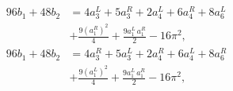 \begin{equation}\begin{split}
96b_1+48b_2&=4a_3^L+5a_3^R+2a_4^L+6a_4^R+8a_6^L\\&
+\frac{9(a_1^R)^2}{4}+\frac{9a_1^L\, a_1^R}{2}-16\pi^2,\\
96b_1+48b_2&=4a_3^R+5a_3^L+2a_4^R+6a_4^L+8a_6^R\\&
+\frac{9(a_1^L)^2}{4}+\frac{9a_1^L\, a_1^R}{2}-16\pi^2,
\end{split}\end{equation}

